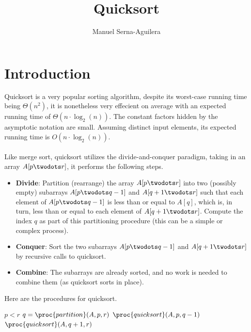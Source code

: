 \documentclass{article}
\title{Quicksort}
\author{Manuel Serna-Aguilera}
\date{}
\begin{document}
\maketitle

\section*{Introduction}
Quicksort is a very popular sorting algorithm, despite its worst-case running time being $\Theta{(n^2)}$, it is nonetheless very effecient on average with an expected running time of $\Theta{(n \cdot \log_2(n))}$. The constant factors hidden by the asymptotic notation are small. Assuming distinct input elements, its expected running time is $O{(n \cdot \log_2(n))}$.
\\ \\
Like merge sort, quicksort utilizes the divide-and-conquer paradigm, taking in an array $A[p \twodots r]$, it performs the following steps.
\begin{itemize}
    \item[] \textbf{Divide}: Partition (rearrange) the array $A[p \twodots r]$ into two (possibly empty) subarrays $A[p \twodots q-1]$ and $A[q+1 \twodots r]$ such that each element of $A[p \twodots q-1]$ is less than or equal to $A[q]$, which is, in turn, less than or equal to each element of $A[q+1 \twodots r]$. Compute the index $q$ as part of this partitioning procedure (this can be a simple or complex process).
    \item[] \textbf{Conquer}: Sort the two subarrays $A[p \twodots q-1]$ and $A[q+1 \twodots r]$ by recursive calls to quicksort.
    \item[] \textbf{Combine}: The subarrays are already sorted, and no work is needed to combine them (as quicksort sorts in place).
\end{itemize}

\newpage

Here are the procedures for quicksort.

\begin{codebox}
\li \If $p < r$
\li \Then
        $q = \proc{partition}(A, p, r)$
\li     $\proc{quicksort}(A, p, q-1)$
\li     $\proc{quicksort}(A, q+1, r)$
    \End
\end{codebox}
\end{document}
